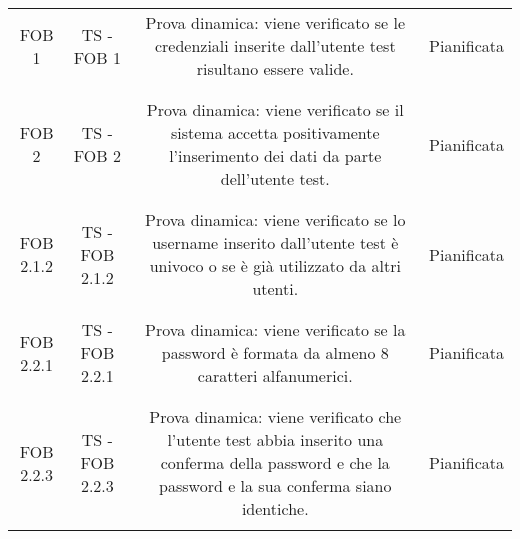 {{{\begin{table}[h!]
\begin{center}
\begin{minipage}{1\linewidth}
\begin{tabular}{c c c c}
							FOB 1
							&
							TS - FOB 1			
							& 
							\begin{minipage}{0.55\linewidth}
								Prova dinamica: viene verificato se le credenziali inserite 
								dall'utente test risultano essere valide.
							\end{minipage}	
							&
							Pianificata
							\\
							\\
							\bottomrule
							\\
							FOB 2
							&
							TS - FOB 2 			
							& 
							\begin{minipage}{0.55\linewidth}
								Prova dinamica: viene verificato se il sistema accetta
								positivamente l'inserimento dei dati da parte dell'utente test.
							\end{minipage}	
							&
							Pianificata
							\\
							\\
							\bottomrule
							\\
							FOB 2.1.2
							&
							TS - FOB 2.1.2			
							& 
							\begin{minipage}{0.55\linewidth}
								Prova dinamica: viene verificato se lo username inserito
								dall'utente test è univoco o se è già utilizzato da altri
								utenti.
							\end{minipage}	
							&
							Pianificata
							\\
							\\
							\bottomrule
							\\
							FOB 2.2.1
							&
							TS - FOB 2.2.1			
							& 
							\begin{minipage}{0.55\linewidth}
								Prova dinamica: viene verificato se la password è formata da
								almeno 8 caratteri alfanumerici.
							\end{minipage}	
							&
							Pianificata
							\\
							\\
							\bottomrule
							\\
							FOB 2.2.3
							&
							TS - FOB 2.2.3 			
							& 
							\begin{minipage}{0.55\linewidth}
								Prova dinamica: viene verificato che l'utente test abbia
								inserito una conferma della password e che la password e la sua
								conferma siano identiche.
							\end{minipage}	
							&
							Pianificata
							\\
							\\

\end{tabular}
\end{minipage}
\end{center}
\end{table}}}}
